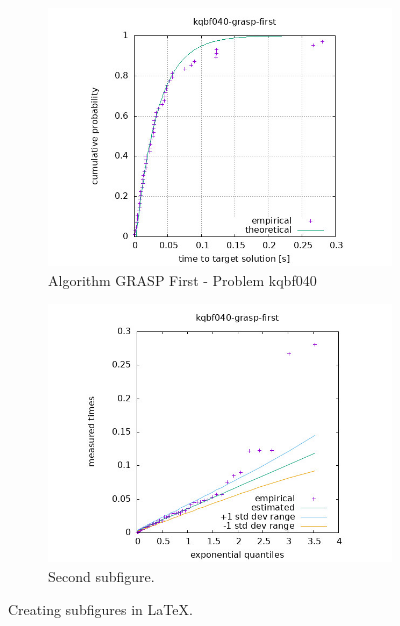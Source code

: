 \begin{figure}[H]
    \centering
    \begin{subfigure}{0.49\textwidth}
        \includegraphics[width=\textwidth]{figure/ttt_plot/kqbf040-grasp-first-exp.jpeg}
        \caption{Algorithm GRASP First - Problem kqbf040}
        \label{fig:grasp-first-kqbf040-exp}
    \end{subfigure}
    \hfill
    \begin{subfigure}{0.49\textwidth}
        \includegraphics[width=\textwidth]{figure/ttt_plot/kqbf040-grasp-first-qq.jpeg}
        \caption{Second subfigure.}
        \label{fig:grasp-first-kqbf040-qq}
    \end{subfigure}
    \caption{Creating subfigures in \LaTeX.}
    \label{fig:grasp-first-kqbf040}
\end{figure}


